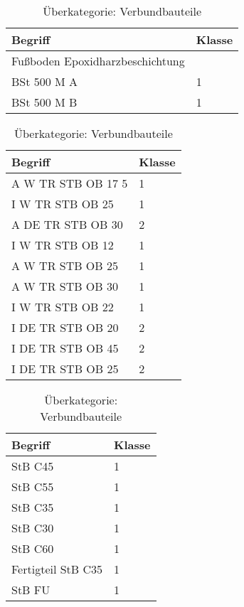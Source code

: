 \begin{table}[h]
	\label{t:evaluation-example20}
	\centering
	\begin{tabular}{|p{}|p{}|}
		\hline
		\textbf{Begriff} & \textbf{Klasse} \\ \hline
		        Fußboden Epoxidharzbeschichtung & ~ \\ \hline
		BSt 500 M A & 1 \\ \hline
		BSt 500 M B & 1 \\ \hline
	\end{tabular}
	\caption{Überkategorie: Verbundbauteile}
\end{table}

\begin{table}[h]
	\label{t:evaluation-example21}
	\centering
	\begin{tabular}{|p{}|p{}|}
		\hline
		\textbf{Begriff} & \textbf{Klasse} \\ \hline
		  A W TR STB OB 17 5 & 1 \\ \hline
		I W TR STB OB 25 & 1 \\ \hline
		A DE TR STB OB 30 & 2 \\ \hline
		I W TR STB OB 12 & 1 \\ \hline
		A W TR STB OB 25 & 1 \\ \hline
		A W TR STB OB 30 & 1 \\ \hline
		I W TR STB OB 22 & 1 \\ \hline
		I DE TR STB OB 20 & 2 \\ \hline
		I DE TR STB OB 45 & 2 \\ \hline
		I DE TR STB OB 25 & 2 \\ \hline
	\end{tabular}
	\caption{Überkategorie: Verbundbauteile}
\end{table}

\begin{table}[h]
	\label{t:evaluation-example22}
	\centering
	\begin{tabular}{|p{}|p{}|}
		\hline
		\textbf{Begriff} & \textbf{Klasse} \\ \hline
		StB C45 & 1 \\ \hline
		StB C55 & 1 \\ \hline
		StB C35 & 1 \\ \hline
		StB C30 & 1 \\ \hline
		StB C60 & 1 \\ \hline
		Fertigteil StB C35 & 1 \\ \hline
		StB FU & 1 \\ \hline
	\end{tabular}
	\caption{Überkategorie: Verbundbauteile}
\end{table}